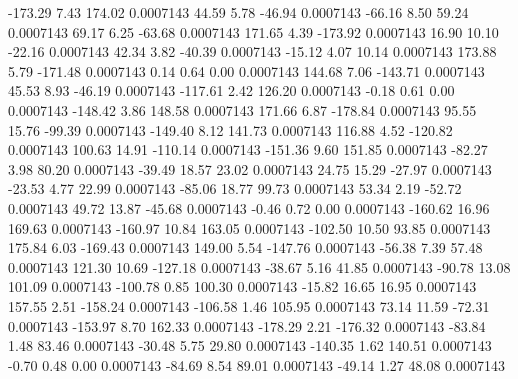      -173.29        7.43      174.02     0.0007143
       44.59        5.78      -46.94     0.0007143
      -66.16        8.50       59.24     0.0007143
       69.17        6.25      -63.68     0.0007143
      171.65        4.39     -173.92     0.0007143
       16.90       10.10      -22.16     0.0007143
       42.34        3.82      -40.39     0.0007143
      -15.12        4.07       10.14     0.0007143
      173.88        5.79     -171.48     0.0007143
        0.14        0.64        0.00     0.0007143
      144.68        7.06     -143.71     0.0007143
       45.53        8.93      -46.19     0.0007143
     -117.61        2.42      126.20     0.0007143
       -0.18        0.61        0.00     0.0007143
     -148.42        3.86      148.58     0.0007143
      171.66        6.87     -178.84     0.0007143
       95.55       15.76      -99.39     0.0007143
     -149.40        8.12      141.73     0.0007143
      116.88        4.52     -120.82     0.0007143
      100.63       14.91     -110.14     0.0007143
     -151.36        9.60      151.85     0.0007143
      -82.27        3.98       80.20     0.0007143
      -39.49       18.57       23.02     0.0007143
       24.75       15.29      -27.97     0.0007143
      -23.53        4.77       22.99     0.0007143
      -85.06       18.77       99.73     0.0007143
       53.34        2.19      -52.72     0.0007143
       49.72       13.87      -45.68     0.0007143
       -0.46        0.72        0.00     0.0007143
     -160.62       16.96      169.63     0.0007143
     -160.97       10.84      163.05     0.0007143
     -102.50       10.50       93.85     0.0007143
      175.84        6.03     -169.43     0.0007143
      149.00        5.54     -147.76     0.0007143
      -56.38        7.39       57.48     0.0007143
      121.30       10.69     -127.18     0.0007143
      -38.67        5.16       41.85     0.0007143
      -90.78       13.08      101.09     0.0007143
     -100.78        0.85      100.30     0.0007143
      -15.82       16.65       16.95     0.0007143
      157.55        2.51     -158.24     0.0007143
     -106.58        1.46      105.95     0.0007143
       73.14       11.59      -72.31     0.0007143
     -153.97        8.70      162.33     0.0007143
     -178.29        2.21     -176.32     0.0007143
      -83.84        1.48       83.46     0.0007143
      -30.48        5.75       29.80     0.0007143
     -140.35        1.62      140.51     0.0007143
       -0.70        0.48        0.00     0.0007143
      -84.69        8.54       89.01     0.0007143
      -49.14        1.27       48.08     0.0007143

